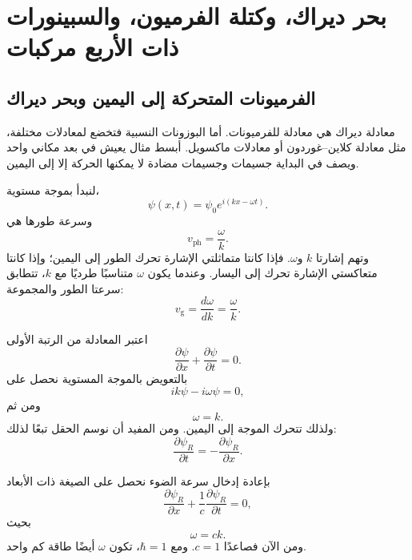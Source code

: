 \chapter{بحر ديراك، وكتلة الفرميون، والسبينورات ذات الأربع مركبات}

\section{الفرميونات المتحركة إلى اليمين وبحر ديراك}

معادلة ديراك هي معادلة للفرميونات. أما البوزونات النسبية فتخضع لمعادلات مختلفة، مثل معادلة كلاين--غوردون أو معادلات ماكسويل. أبسط مثال يعيش في بعد مكاني واحد ويصف في البداية جسيمات وجسيمات مضادة لا يمكنها الحركة إلا إلى اليمين.

لنبدأ بموجة مستوية،
\begin{equation}
\psi(x,t)=\psi_0 e^{i(kx-\omega t)}.
\end{equation}
وسرعة طورها هي
\begin{equation}
v_{\mathrm{ph}}=\frac{\omega}{k}.
\end{equation}
وتهم إشارتا \(k\) و\(\omega\). فإذا كانتا متماثلتي الإشارة تحرك الطور إلى اليمين؛ وإذا كانتا متعاكستي الإشارة تحرك إلى اليسار. وعندما يكون \(\omega\) متناسبًا طرديًا مع \(k\)، تتطابق سرعتا الطور والمجموعة:
\begin{equation}
v_{\mathrm{g}}=\frac{d\omega}{dk}=\frac{\omega}{k}.
\end{equation}

اعتبر المعادلة من الرتبة الأولى
\begin{equation}
\frac{\partial\psi}{\partial x}
+
\frac{\partial\psi}{\partial t}
=0.
\end{equation}
بالتعويض بالموجة المستوية نحصل على
\begin{equation}
ik\psi-i\omega\psi=0,
\end{equation}
ومن ثم
\begin{equation}
\omega=k.
\end{equation}
ولذلك تتحرك الموجة إلى اليمين. ومن المفيد أن نوسم الحقل تبعًا لذلك:
\begin{equation}
\frac{\partial\psi_R}{\partial t}
=
-\frac{\partial\psi_R}{\partial x}.
\end{equation}

بإعادة إدخال سرعة الضوء نحصل على الصيغة ذات الأبعاد
\begin{equation}
\frac{\partial\psi_R}{\partial x}
+
\frac{1}{c}\frac{\partial\psi_R}{\partial t}
=0,
\end{equation}
بحيث
\begin{equation}
\omega=ck.
\end{equation}
ومن الآن فصاعدًا \(c=1\). ومع \(\hbar=1\)، تكون \(\omega\) أيضًا طاقة كم واحد.

